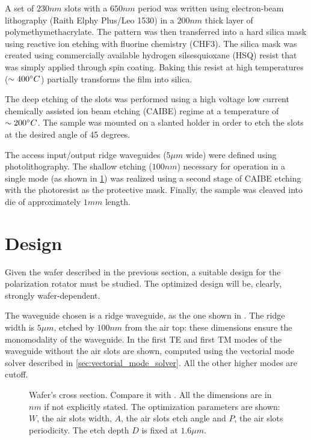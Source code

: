 A set of $230 nm$ slots with a $650 nm$ period was written using
electron-beam lithography (Raith Elphy Plus/Leo 1530) in a $200 nm$
thick layer of poly\-methy\-metha\-cry\-la\-te. The pattern was then transferred
into a hard silica mask using reactive ion etching with fluorine
chemistry (CHF3). The silica mask was created using commercially
available hydrogen silsesquioxane (HSQ) resist that was simply applied
through spin coating. Baking this resist at high temperatures ($\sim
400^\circ C$) partially transforms the film into silica.

The deep etching of the slots was performed using a high voltage low
current chemically assisted ion beam etching (CAIBE) regime at a
temperature of $\sim 200^\circ C$. The sample was mounted on a slanted
holder in order to etch the slots at the desired angle of 45
degrees.

The access input/output ridge waveguides ($5 \mu m$ wide) were defined
using photolithography. The shallow etching ($100 nm$) necessary for
operation in a single mode (as shown in \ref{sec:polrot_design}) was
realized using a second stage of CAIBE etching with the photoresist as
the protective mask. Finally, the sample was cleaved into die of
approximately $1mm$ length.

\section{Design} \label{sec:polrot_design}

Given the wafer described in the previous section, a suitable design
for the polarization rotator must be studied. The optimized design
will be, clearly, strongly wafer-dependent.

The waveguide chosen is a ridge waveguide, as the one shown in
. The ridge width is $5 \mu m$, etched by
$100 nm$ from the air top: these dimensions ensure the monomodality of
the waveguide. In  the first TE and first TM
modes of the waveguide without the air slots are shown, computed using
the vectorial mode solver described in
\ref{sec:vectorial_mode_solver}. All the other higher modes are
cutoff.

\begin{figure}[htbp]
  \begin{center}
    \resizebox{!}{5cm}{}
    \resizebox{!}{5cm}{}
  \end{center}
  \caption{Wafer's cross section. Compare it with
    . All the dimensions are in
    $nm$ if not explicitly stated. The optimization parameters are
    shown: $W$, the air slots width, $A$, the air slots etch angle and
    $P$, the air slots periodicity. The etch depth $D$ is fixed at $1.6
    \mu m$.}
  \label{fig:polrot_wafer}
\end{figure}

